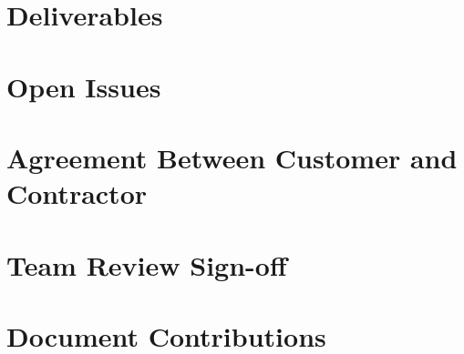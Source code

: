 \documentclass{article}
\begin{document}
\section{Deliverables}
\section{Open Issues}
\appendix

\section{Agreement Between Customer and Contractor}
\section{Team Review Sign-off}
\section{Document Contributions}
\end{document}
